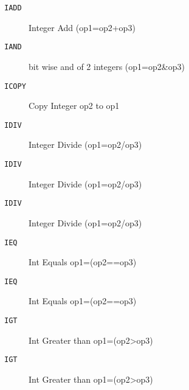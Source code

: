 \begin{description}
\item[\texttt{IADD}]  Integer Add (op1=op2+op3)\\

\end{description}
\begin{description}
\item[\texttt{IAND}]  bit wise and of 2 integers (op1=op2\&op3)\\

\end{description}
\begin{description}
\item[\texttt{ICOPY}]  Copy Integer op2 to op1\\

\end{description}
\begin{description}
\item[\texttt{IDIV}]  Integer Divide (op1=op2/op3)\\

\end{description}
\begin{description}
\item[\texttt{IDIV}]  Integer Divide (op1=op2/op3)\\

\end{description}
\begin{description}
\item[\texttt{IDIV}]  Integer Divide (op1=op2/op3)\\

\end{description}
\begin{description}
\item[\texttt{IEQ}]  Int Equals op1=(op2==op3)\\

\end{description}
\begin{description}
\item[\texttt{IEQ}]  Int Equals op1=(op2==op3)\\

\end{description}
\begin{description}
\item[\texttt{IGT}]  Int Greater than op1=(op2>op3)\\

\end{description}
\begin{description}
\item[\texttt{IGT}]  Int Greater than op1=(op2>op3)\\

\end{description}
